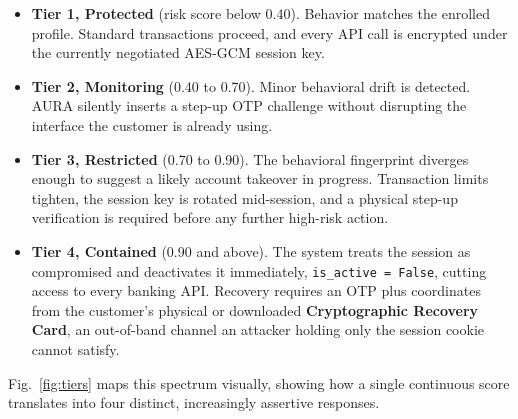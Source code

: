 \documentclass[11pt,journal,onecolumn]{article}
\begin{document}
\begin{itemize}
    \item \textbf{Tier 1, Protected} (risk score below 0.40). Behavior matches the enrolled profile. Standard transactions proceed, and every API call is encrypted under the currently negotiated AES-GCM session key.
    \item \textbf{Tier 2, Monitoring} (0.40 to 0.70). Minor behavioral drift is detected. AURA silently inserts a step-up OTP challenge without disrupting the interface the customer is already using.
    \item \textbf{Tier 3, Restricted} (0.70 to 0.90). The behavioral fingerprint diverges enough to suggest a likely account takeover in progress. Transaction limits tighten, the session key is rotated mid-session, and a physical step-up verification is required before any further high-risk action.
    \item \textbf{Tier 4, Contained} (0.90 and above). The system treats the session as compromised and deactivates it immediately, \texttt{is\_active = False}, cutting access to every banking API. Recovery requires an OTP plus coordinates from the customer's physical or downloaded \textbf{Cryptographic Recovery Card}, an out-of-band channel an attacker holding only the session cookie cannot satisfy.
\end{itemize}

Fig.~\ref{fig:tiers} maps this spectrum visually, showing how a single continuous score translates into four distinct, increasingly assertive responses.
\end{document}
